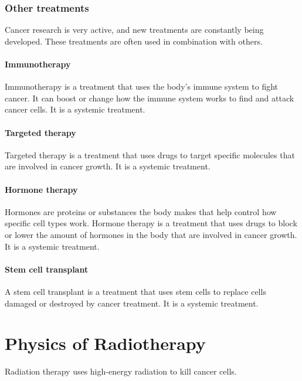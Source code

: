 \subsubsection{Other treatments}
Cancer research is very active, and new treatments are constantly being developed.
These treatments are often used in combination with others.

\paragraph{Immunotherapy}
Immunotherapy is a treatment that uses the body's immune system to fight cancer.
It can boost or change how the immune system works to find and attack cancer cells.
It is a systemic treatment.

\paragraph{Targeted therapy}
Targeted therapy is a treatment that uses drugs to target specific molecules that are involved in cancer growth.
It is a systemic treatment.

\paragraph{Hormone therapy}
Hormones are proteins or substances the body makes that help control how specific cell types work.
Hormone therapy is a treatment that uses drugs to block or lower the amount of hormones in the body that are involved in cancer growth.
It is a systemic treatment.

\paragraph{Stem cell transplant}
A stem cell transplant is a treatment that uses stem cells to replace cells damaged or destroyed by cancer treatment.
It is a systemic treatment.






\section{Physics of Radiotherapy}
Radiation therapy uses high-energy radiation to kill cancer cells.

